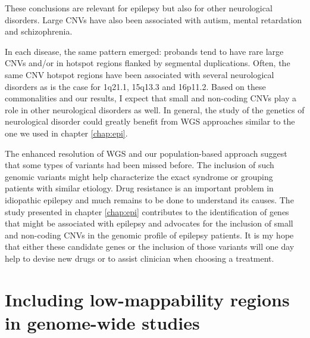 These conclusions are relevant for epilepsy but also for other neurological disorders.
Large CNVs have also been associated with autism\cite{Pinto2010}, mental retardation\cite{Mefford2009} and schizophrenia\cite{Walsh2008,Marshall2016}.
\begin{comment}
  Genes in neurological pathways tend to be large and organized in large gene families often located within segmental duplications. 
\end{comment}
In each disease, the same pattern emerged: probands tend to have rare large CNVs and/or in hotspot regions flanked by segmental duplications.
Often, the same CNV hotspot regions have been associated with several neurological disorders as is the case for 1q21.1, 15q13.3 and 16p11.2\cite{Mefford2009}.
Based on these commonalities and our results, I expect that small and non-coding CNVs play a role in other neurological disorders as well.
In general, the study of the genetics of neurological disorder could greatly benefit from WGS approaches similar to the one we used in chapter \ref{chap:epi}.

The enhanced resolution of WGS and our population-based approach suggest that some types of variants had been missed before.
The inclusion of such genomic variants might help characterize the exact syndrome or grouping patients with similar etiology.
Drug resistance is an important problem in idiopathic epilepsy and much remains to be done to understand its causes.
The study presented in chapter \ref{chap:epi} contributes to the identification of genes that might be associated with epilepsy and advocates for the inclusion of small and non-coding CNVs in the genomic profile of epilepsy patients.
It is my hope that either these candidate genes or the inclusion of those variants will one day help to devise new drugs or to assist clinician when choosing a treatment.


\section*{Including low-mappability regions in genome-wide studies}

